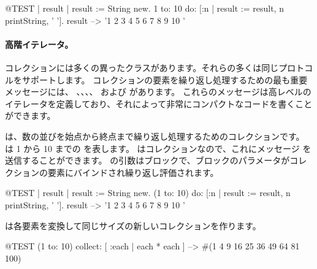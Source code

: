 \documentclass[a4paper,10pt,twoside]{book}
\begin{document}
\begin{code}{@TEST | result |}
result := String new.
1 to: 10 do: [:n | result := result, n printString, ' '].
result --> '1 2 3 4 5 6 7 8 9 10 '
\end{code}


\paragraph{高階イテレータ。}
コレクションには多くの異ったクラスがあります。それらの多くは同じプロトコルをサポートします。
コレクションの要素を繰り返し処理するための最も重要メッセージには、
、、、、 および  があります。
これらのメッセージは高レベルのイテレータを定義しており、それによって非常にコンパクトなコードを書くことができます。

 は、数の並びを始点から終点まで繰り返し処理するためのコレクションです。
は 1 から 10 までの  を表します。
 はコレクションなので、これにメッセージ  を送信することができます。
 の引数はブロックで、ブロックのパラメータがコレクションの要素にバインドされ繰り返し評価されます。

\begin{code}{@TEST | result |}
result := String new.
(1 to: 10) do: [:n | result := result, n printString, ' '].
result --> '1 2 3 4 5 6 7 8 9 10 '
\end{code}


 は各要素を変換して同じサイズの新しいコレクションを作ります。
\begin{code}{@TEST}
(1 to: 10) collect: [ :each | each * each ] --> #(1 4 9 16 25 36 49 64 81 100)
\end{code}
\end{document}
